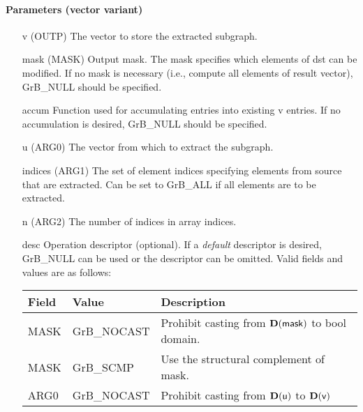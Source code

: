 \paragraph{Parameters (vector variant)}

\begin{itemize}[leftmargin=1in]
    \item[{\sf v}]   ({\sf OUTP}) The vector to store the extracted subgraph.

    \item[{\sf mask}] ({\sf MASK}) Output mask. The mask
    specifies which elements of {\sf dst} can be modified.
    If no mask is necessary (i.e., compute all elements of result
    vector), {\sf GrB\_NULL} should be specified.

    \item[{\sf accum}]  Function used for accumulating entries into existing {\sf v} entries. 
			If no accumulation is desired, {\sf GrB\_NULL} should be specified.

    \item[{\sf u}]   ({\sf ARG0}) The vector from which to extract the subgraph.
    \item[{\sf indices}]     ({\sf ARG1}) The set of element indices specifying elements from source that
                              are extracted. Can
                              be set to {\sf GrB\_ALL} if all elements are
                              to be extracted.
    \item[{\sf n}]     ({\sf ARG2}) The number of indices in array {\sf indices}.

    \item[{\sf desc}]   Operation descriptor (optional). If a
    \emph{default} descriptor is desired, {\sf GrB\_NULL} can be
    used or the descriptor can be omitted.  Valid fields and values are as follows: \\
    \begin{tabular}{lll}
    Field  & Value & Description \\
    \hline
    {\sf MASK} & {\sf GrB\_NOCAST} & Prohibit casting from $\bold{D}({\sf mask})$ to {\sf bool} domain. \\
    {\sf MASK} & {\sf GrB\_SCMP}   & Use the structural complement of {\sf mask}. \\
    {\sf ARG0} & {\sf GrB\_NOCAST} & Prohibit casting from $\bold{D}({\sf u})$ to $\bold{D}({\sf v})$ \\
    \end{tabular}
\end{itemize}

